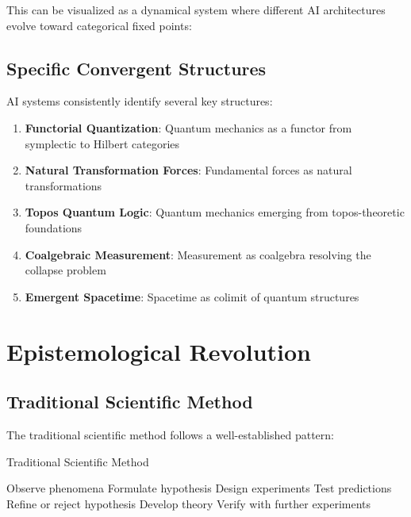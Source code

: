 \documentclass[11pt,a4paper]{article}
\begin{document}
This can be visualized as a dynamical system where different AI architectures evolve toward categorical fixed points:

\begin{center}
\end{center}

\subsection{Specific Convergent Structures}

AI systems consistently identify several key structures:

\begin{enumerate}
    \item \textbf{Functorial Quantization}: Quantum mechanics as a functor from symplectic to Hilbert categories
    \item \textbf{Natural Transformation Forces}: Fundamental forces as natural transformations
    \item \textbf{Topos Quantum Logic}: Quantum mechanics emerging from topos-theoretic foundations
    \item \textbf{Coalgebraic Measurement}: Measurement as coalgebra resolving the collapse problem
    \item \textbf{Emergent Spacetime}: Spacetime as colimit of quantum structures
\end{enumerate}

\section{Epistemological Revolution}

\subsection{Traditional Scientific Method}

The traditional scientific method follows a well-established pattern:

\begin{algorithm}
\caption{Traditional Scientific Method}
\begin{algorithmic}[1]
\STATE Observe phenomena
\STATE Formulate hypothesis
\STATE Design experiments
\STATE Test predictions
\STATE Refine or reject hypothesis
\STATE Develop theory
\STATE Verify with further experiments
\end{algorithmic}
\end{algorithm}
\end{document}
